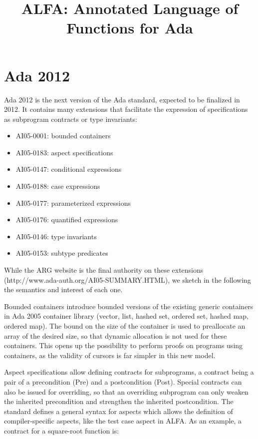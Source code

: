 \documentclass{article}
\title{ALFA: Annotated Language of Functions for Ada}
\begin{document}
\maketitle

\section{Ada 2012}

Ada 2012 is the next version of the Ada standard, expected to be finalized in
2012. It contains many extensions that facilitate the expression of
specifications as subprogram contracts or type invariants:

\begin{itemize}
\item AI05-0001: bounded containers
\item AI05-0183: aspect specifications
\item AI05-0147: conditional expressions
\item AI05-0188: case expressions
\item AI05-0177: parameterized expressions
\item AI05-0176: quantified expressions
\item AI05-0146: type invariants
\item AI05-0153: subtype predicates
\end{itemize}

While the ARG website is the final authority on these extensions
(http://www.ada-auth.org/AI05-SUMMARY.HTML), we sketch in the following the
semantics and interest of each one.

Bounded containers introduce bounded versions of the existing generic
containers in Ada 2005 container library (vector, list, hashed set, ordered
set, hashed map, ordered map). The bound on the size of the container is used
to preallocate an array of the desired size, so that dynamic allocation is not
used for these containers. This opens up the possibility to perform proofs on
programs using containers, as the validity of cursors is far simpler in this
new model.

Aspect specifications allow defining contracts for subprograms, a contract
being a pair of a precondition (Pre) and a postcondition (Post). Special
contracts can also be issued for overriding, so that an overriding subprogram
can only weaken the inherited precondition and strengthen the inherited
postcondition. The standard defines a general syntax for aspects which allows
the definition of compiler-specific aspects, like the test case aspect in ALFA.
As an example, a contract for a square-root function is:
\end{document}
